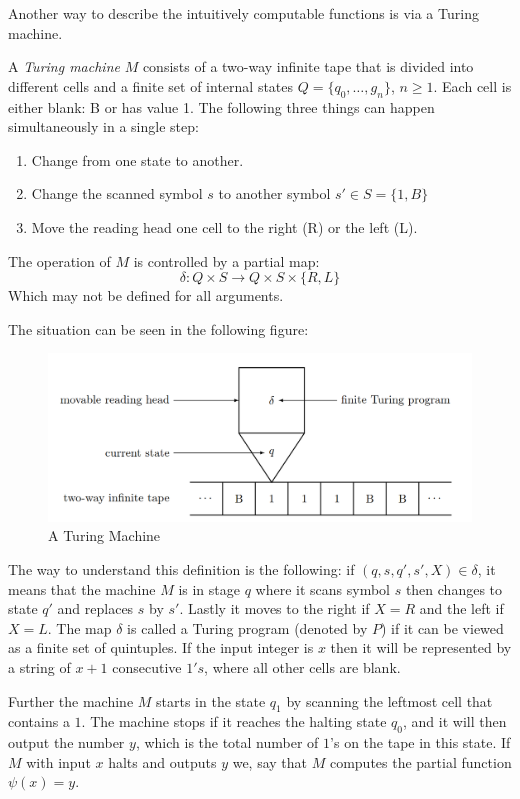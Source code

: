 \documentclass[../main.tex]{subfiles}
\begin{document}
Another way to describe the intuitively computable functions is via a Turing
machine. 
\begin{defi}
	A \textit{Turing machine} $M$ consists of a two-way infinite tape that
	is divided into different cells and a finite set of internal states $Q=\{
	q_0,\ldots, g_n\}$, $n\geq 1$. Each cell  is either blank: B or has
	value 1.
	The following three things can happen simultaneously in a single
	step:
	\begin{enumerate}
		\item Change from one state to another.
		\item Change the scanned symbol $s$ to another symbol
			$s'\in S=\{1,B\}$
		\item Move the reading head one cell to the right (R) or the left
			(L).
	\end{enumerate}
	The operation of $M$ is controlled by a partial map:
	$$\delta:Q\times S\rightarrow Q\times S\times\{R,L\}$$
	Which may not be defined for all arguments.
\end{defi}
The situation can be seen in the following figure:
\begin{center}
	\begin{figure}[h]
\includegraphics[width=\textwidth]{Turnig.png}
\caption[asd]{A Turing Machine\footnotemark}
\end{figure}
\end{center}
The way to understand this definition is the following: if
$(q,s,q',s',X)\in\delta$, it means that the machine $M$ is in stage $q$ where it
scans symbol $s$ then changes to state $q'$ and replaces $s$ by $s'$. Lastly it
moves to the right if $X=R$ and the left if $X=L$. The map $\delta$ is called a
Turing program (denoted by $P$) if it can be viewed as a finite set of quintuples. If the input
integer is $x$ then it will be represented by a string of $x+1$ consecutive
$1's$, where all other cells are blank.

Further the machine $M$ starts in the state $q_1$ by scanning the leftmost cell
that contains a $1$. The machine stops if it reaches the halting state $q_0$,
and it will then output the number $y$, which is the total number of $1$'s on
the tape in this state. If $M$ with input $x$ halts and outputs $y$ we,
say that $M$ computes the partial function $\psi(x)=y$.
\end{document}
